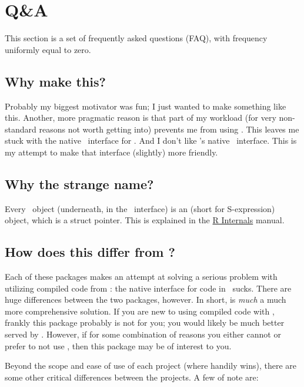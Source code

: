 \section{Q\&A}

This section is a set of frequently asked questions (FAQ), with frequency uniformly
equal to zero.


\subsection{Why make this?}

Probably my biggest motivator was fun; I just wanted to make something like this.  Another,
more pragmatic reason is that part of my workload (for very non-standard reasons not worth 
getting into) prevents me from using .  This leaves me stuck with the native \C\ 
interface for \R.  And I don't like \R's native \C\ interface.  This is my attempt to 
make that interface (slightly) more friendly.


\subsection{Why the strange name?}

Every \R\ object (underneath, in the \C\ interface) is an  (short for
S-expression) object, which is a struct pointer.  This is explained in the
\href{http://cran.r-project.org/doc/manuals/R-ints.html#SEXPs}{R Internals} 
manual.


\subsection{How does this differ from ?}
Each of these packages makes an attempt at solving a serious problem with utilizing compiled
code from \R: the native interface for \proglang{C} code in \R\ sucks.  There are huge 
differences between the two packages, however. In short, \pkg{Rcpp} is \emph{much} a much 
more comprehensive solution.  If you are new to using compiled code with \R, frankly this 
package probably is not for you; you would likely be much better served by .  
However, if for some combination of reasons you either cannot or prefer to not use 
\pkg{Rcpp}, then this package may be of interest to you.

Beyond the scope and ease of use of each project (where  handily wins), there are
some other critical differences between the projects.  A few of note are:

